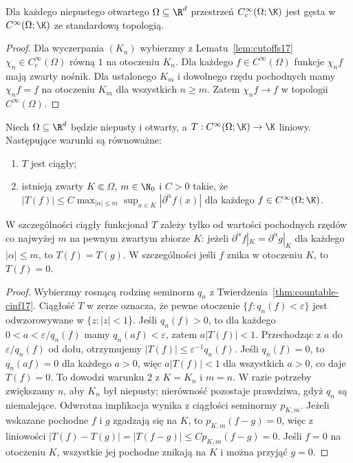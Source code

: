 \begin{wniosek}
\label{cor:density-cinf17}
Dla każdego niepustego otwartego $\Omega\subseteq\R^d$
przestrzeń $C_c^\infty(\Omega;\K)$ jest gęsta w
$C^\infty(\Omega;\K)$ ze standardową topologią.
\end{wniosek}
\begin{proof}
Dla wyczerpania $(K_n)$ wybierzmy z Lematu~\ref{lem:cutoffs17}
$\chi_n\in C_c^\infty(\Omega)$ równą $1$ na otoczeniu $K_n$.
Dla każdego $f\in C^\infty(\Omega)$ funkcje $\chi_n f$
mają zwarty nośnik. Dla ustalonego $K_m$ i dowolnego
rzędu pochodnych mamy $\chi_n f=f$ na otoczeniu $K_m$
dla wszystkich $n\ge m$. Zatem $\chi_n f\to f$
w topologii $C^\infty(\Omega)$.
\end{proof}

\begin{twierdzenie}
\label{thm:dual-cinf17}
Niech $\Omega\subseteq\R^d$ będzie niepusty i otwarty,
a $T:C^\infty(\Omega;\K)\to\K$ liniowy.
Następujące warunki są równoważne:
\begin{enumerate}
\item $T$ jest ciągły;
\item istnieją zwarty $K\Subset\Omega$, $m\in\N_0$ i $C>0$ takie, że
$|T(f)|\le C\max_{|\alpha|\le m}\sup_{x\in K}|\partial^\alpha f(x)|$
dla każdego $f\in C^\infty(\Omega;\K)$.
\end{enumerate}
W szczególności ciągły funkcjonał $T$ zależy tylko od wartości
pochodnych rzędów co najwyżej $m$ na pewnym zwartym zbiorze $K$:
jeżeli $\partial^\alpha f|_K=\partial^\alpha g|_K$ dla każdego
$|\alpha|\le m$, to $T(f)=T(g)$.
W szczególności jeśli $f$ znika w otoczeniu $K$, to $T(f)=0$.
\end{twierdzenie}
\begin{proof}
Wybierzmy rosnącą rodzinę seminorm $q_n$ z
Twierdzenia~\ref{thm:countable-cinf17}.
Ciągłość $T$ w zerze oznacza, że pewne otoczenie
$\{f:q_n(f)<\varepsilon\}$ jest odwzorowywane w
$\{z:|z|<1\}$. Jeśli $q_n(f)>0$, to dla każdego $0<a<\varepsilon/q_n(f)$
mamy $q_n(af)<\varepsilon$, zatem $a|T(f)|<1$.
Przechodząc z $a$ do $\varepsilon/q_n(f)$ od dołu,
otrzymujemy $|T(f)|\le\varepsilon^{-1}q_n(f)$.
Jeśli $q_n(f)=0$, to $q_n(af)=0$ dla każdego $a>0$,
więc $a|T(f)|<1$ dla wszystkich $a>0$, co daje $T(f)=0$.
To dowodzi warunku 2 z $K=K_n$ i $m=n$.
W razie potrzeby zwiększamy $n$, aby $K_n$ był niepusty;
nierówność pozostaje prawdziwa, gdyż $q_n$ są niemalejące.
Odwrotna implikacja wynika z ciągłości seminormy $p_{K,m}$.
Jeżeli wskazane pochodne $f$ i $g$ zgadzają się na $K$,
to $p_{K,m}(f-g)=0$, więc z liniowości
$|T(f)-T(g)|=|T(f-g)|\le Cp_{K,m}(f-g)=0$.
Jeśli $f=0$ na otoczeniu $K$, wszystkie jej pochodne
znikają na $K$ i można przyjąć $g=0$.
\end{proof}

